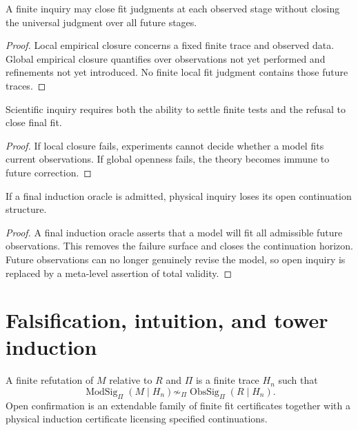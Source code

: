 \begin{theorem}
\label{thm:local-closure-not-global-closure}
A finite inquiry may close fit judgments at each observed stage without closing the universal judgment over all future stages.
\end{theorem}

\begin{proof}
Local empirical closure concerns a fixed finite trace and observed data. Global empirical closure quantifies over observations not yet performed and refinements not yet introduced. No finite local fit judgment contains those future traces.
\end{proof}

\begin{corollary}
\label{cor:science-local-closure-global-openness}
Scientific inquiry requires both the ability to settle finite tests and the refusal to close final fit.
\end{corollary}

\begin{proof}
If local closure fails, experiments cannot decide whether a model fits current observations. If global openness fails, the theory becomes immune to future correction.
\end{proof}

\begin{theorem}
\label{thm:final-induction-oracle-collapses-inquiry}
If a final induction oracle is admitted, physical inquiry loses its open continuation structure.
\end{theorem}

\begin{proof}
A final induction oracle asserts that a model will fit all admissible future observations. This removes the failure surface and closes the continuation horizon. Future observations can no longer genuinely revise the model, so open inquiry is replaced by a meta-level assertion of total validity.
\end{proof}

\section{Falsification, intuition, and tower induction}
\label{sec:falsification-intuition-tower-induction}

\begin{definition}
\label{def:finite-refutation-open-confirmation}
A finite refutation of $M$ relative to $R$ and $\Pi$ is a finite trace $H_n$ such that
$$
\operatorname{ModSig}_{\Pi}(M\mid H_n)
\not\sim_{\Pi}
\operatorname{ObsSig}_{\Pi}(R\mid H_n).
$$
Open confirmation is an extendable family of finite fit certificates together with a physical induction certificate licensing specified continuations.
\end{definition}

